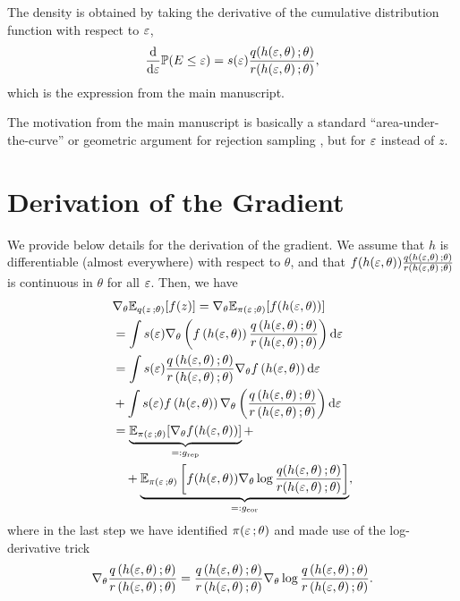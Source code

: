The density is obtained by taking the derivative of the cumulative distribution function with respect to $\varepsilon$,
\begin{align*}
\frac{\textrm{d} }{\textrm{d} \varepsilon} \mathbb{P}(E \leq \varepsilon) =  s(\varepsilon) \frac{q(h(\varepsilon,\theta)\, ;\theta)}{r(h(\varepsilon,\theta)\, ;\theta)},
\end{align*}
which is the expression from the main manuscript.

The motivation from the main manuscript is basically a standard ``area-under-the-curve'' or geometric argument for rejection sampling \citep{robert2004monte}, but for $\varepsilon$ instead of $z$.


\section{Derivation of the Gradient}\label{sec:gradient}
We provide below details for the derivation of the gradient. We assume that $h$ is differentiable (almost everywhere) with respect to $\theta$, and that ${f(h(\varepsilon,\theta))\frac{q(h(\varepsilon,\theta)\, ;\theta)}{r(h(\varepsilon,\theta)\, ;\theta)}}$ is continuous in $\theta$ for all $\varepsilon$. Then, we have
\begin{align*}
\begin{split}
&\nabla_\theta \mathbb{E}_{q(z\, ; \theta)}[f(z)] = \nabla_\theta \mathbb{E}_{\pi(\varepsilon\, ;\theta)}[f(h(\varepsilon,\theta))] \\
&= \int s(\varepsilon) \nabla_\theta \left( f\left(h(\varepsilon,\theta)\right)  \frac{q\left(h(\varepsilon,\theta)\, ; \theta\right)}{r\left(h(\varepsilon,\theta)\, ; \theta\right)}  \right) \textrm{d} \varepsilon\\
&= \int s(\varepsilon)  \frac{q\left(h(\varepsilon,\theta)\, ; \theta\right)}{r\left(h(\varepsilon,\theta)\, ; \theta\right)}  \nabla_\theta f\left(h(\varepsilon,\theta)\right)  \textrm{d} \varepsilon\\
&+ \int s(\varepsilon) f\left(h(\varepsilon,\theta)\right)  \nabla_\theta \left( \frac{q\left(h(\varepsilon,\theta)\, ; \theta\right)}{r\left(h(\varepsilon,\theta)\, ; \theta\right)} \right) \textrm{d} \varepsilon\\
&= \underbrace{\mathbb{E}_{\pi(\varepsilon\, ;\theta)}[\nabla_\theta f(h(\varepsilon,\theta))]}_{=: g_{\text{rep}}}+ \\
&\quad + \underbrace{\mathbb{E}_{\pi(\varepsilon\, ;\theta)}\left[ f(h(\varepsilon,\theta)) \nabla_\theta  \log \frac{q(h(\varepsilon,\theta)\, ; \theta)}{r(h(\varepsilon,\theta)\, ; \theta)} \right]}_{=: g_{\text{cor}}},
\end{split}
\end{align*}
where in the last step we have identified $\pi(\varepsilon\, ;\theta)$ and made use of the log-derivative trick
\begin{align*}
 \nabla_\theta \frac{q\left(h(\varepsilon,\theta)\, ; \theta\right)}{r\left(h(\varepsilon,\theta)\, ; \theta\right)} = \frac{q\left(h(\varepsilon,\theta)\, ; \theta\right)}{r\left(h(\varepsilon,\theta)\, ; \theta\right)} \nabla_\theta \log \frac{q\left(h(\varepsilon,\theta)\, ; \theta\right)}{r\left(h(\varepsilon,\theta)\, ; \theta\right)}.
\end{align*}

